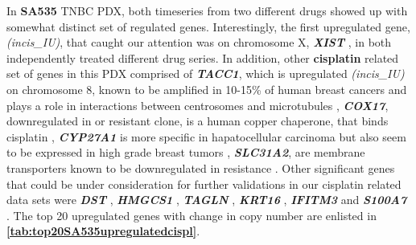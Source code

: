 
In \textbf{SA535} TNBC PDX, both timeseries from two different drugs showed up with somewhat distinct set of regulated genes. Interestingly, the first upregulated gene, \textit{(incis\_IU)}, that caught our attention was on chromosome X, \textit{\textbf{XIST}} \cite{salama2020xist,chen2017long, chen2019up}, in both independently treated different drug series. 
In addition, other \textbf{cisplatin} related set of genes in this PDX comprised of \textit{\textbf{TACC1}}, which is upregulated \textit{(incis\_IU)} on chromosome 8, known to be amplified in 10-15\% of human breast cancers and plays a role in interactions between centrosomes and microtubules \cite{ray2004genomic, gergely2000tacc, shakya2018high},
 \textit{\textbf{COX17}}, downregulated in or resistant clone, is a human copper chaperone, that binds cisplatin \cite{katano2002acquisition, zhao2014cisplatin}, \textit{\textbf{CYP27A1} }is more specific in hapatocellular carcinoma but also seem to be expressed in high grade breast tumors \cite{liang2019cyp27a1, wu201327}, \textit{\textbf{SLC31A2}}, are membrane transporters known to be downregulated in resistance \cite{bai2017structural}. Other significant genes that could be under consideration for further validations in our cisplatin related data sets were \textit{\textbf{DST} } \cite{salerno2016human,lee2012differentially}, \textit{\textbf{HMGCS1}} \cite{walsh2020mevalonate},
\textit{\textbf{TAGLN}} \cite{wu2014transgelin, elsafadi2020transgelin},
\textit{\textbf{KRT16}} \cite{huang2019novel},
\textit{\textbf{IFITM3}} \cite{liu2019ifitm3} and
\textit{\textbf{S100A7}} \cite{zhang2019clinical, mayama2018olfm}. The top 20 upregulated genes with change in copy number are enlisted in \textbf{\autoref{tab:top20SA535upregulatedcispl}}.



